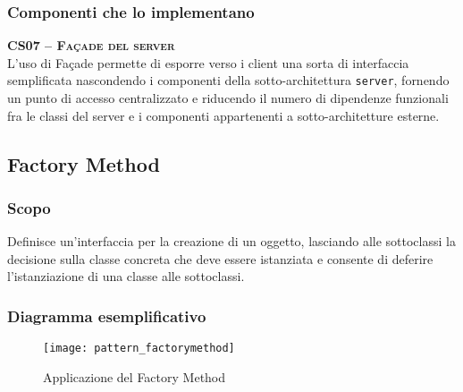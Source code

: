 \subsubsection{Componenti che lo implementano}
\begin{description}
  \item{\scshape\bfseries CS07 -- Façade del server}\\
L'uso di Façade permette di esporre verso i client una sorta di interfaccia semplificata nascondendo i componenti della sotto-architettura \texttt{server}, fornendo un punto di accesso centralizzato e riducendo il numero di dipendenze funzionali fra le classi del server e i componenti appartenenti a sotto-architetture esterne.

\end{description}

\subsection{Factory Method}

\subsubsection{Scopo}
Definisce un'interfaccia per la creazione di un oggetto, lasciando alle sottoclassi la decisione sulla classe concreta che deve essere istanziata e consente di deferire l'istanziazione di una classe alle sottoclassi.

\subsubsection{Diagramma esemplificativo}
\begin{figure}[H]
  \centering
  \texttt{[image: pattern\_factorymethod]}
  \caption{Applicazione del  Factory Method}\label{fig:factory_method}
\end{figure}

